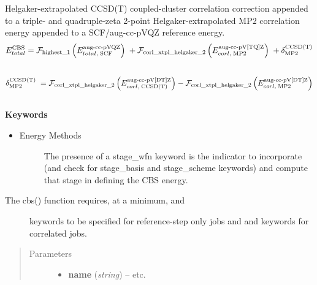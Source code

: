 \documentclass[letterpaper,10pt,english]{sphinxmanual}
\begin{document}
\begin{fulllineitems}
Helgaker-extrapolated CCSD(T) coupled-cluster correlation correction
appended to a triple- and quadruple-zeta 2-point
Helgaker-extrapolated MP2 correlation energy appended to a SCF/aug-cc-pVQZ
reference energy.
\begin{gather}
\begin{split}E_{total}^{\text{CBS}} = \mathcal{F}_{\text{highest\_1}} \left(E_{total,\; \text{SCF}}^{\text{aug-cc-pVQZ}}\right) \; + \mathcal{F}_{\text{corl\_xtpl\_helgaker\_2}} \left(E_{corl,\; \text{MP2}}^{\text{aug-cc-pV[TQ]Z}}\right) \; + \delta_{\text{MP2}}^{\text{CCSD(T)}}\end{split}\notag\\\begin{split}\end{split}\notag
\end{gather}\begin{gather}
\begin{split}\delta_{\text{MP2}}^{\text{CCSD(T)}} \; = \mathcal{F}_{\text{corl\_xtpl\_helgaker\_2}} \left(E_{corl,\; \text{CCSD(T)}}^{\text{aug-cc-pV[DT]Z}}\right) - \mathcal{F}_{\text{corl\_xtpl\_helgaker\_2}} \left(E_{corl,\; \text{MP2}}^{\text{aug-cc-pV[DT]Z}}\right)\end{split}\notag\\\begin{split}\end{split}\notag
\end{gather}
\textbf{Keywords}
\begin{itemize}
\item {} \begin{description}
\item[{Energy Methods}] \leavevmode
The presence of a stage\_wfn keyword is the indicator to incorporate
(and check for stage\_basis and stage\_scheme keywords) and compute
that stage in defining the CBS energy.

\end{description}

\end{itemize}
\begin{description}
\item[{The cbs() function requires, at a minimum,  and }] \leavevmode
keywords to be specified for reference-step only jobs and  and
 keywords for correlated jobs.

\end{description}
\begin{quote}\begin{description}
\item[{Parameters}] \leavevmode\begin{itemize}
\item {} 
\textbf{name} (\emph{string}) -- 
 \textbar{}\textbar{}  \textbar{}\textbar{} etc.


\end{itemize}
\end{description}
\end{quote}
\end{fulllineitems}
\end{document}
